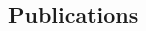 \documentclass[
	10pt, %
]{FreemanCV}
\begin{document}
\begin{paracol}{2}

	
	
	
	
	
	



\section{Publications}










\end{paracol}
\end{document}

